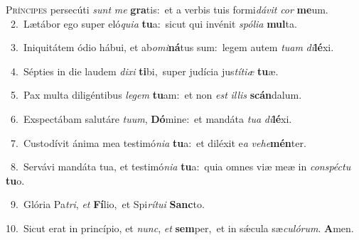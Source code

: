 \lettrine{\initial\textcolor{\initialcolor}{P}}{ríncipes} persecúti \textit{sunt} \textit{me} \textbf{gra}\-tis:~\star et a verbis tuis formi\-\textit{dá}\-\textit{vit} \textit{cor} \textbf{me}\-um.\\
{\numbfont\textcolor{\numbcolor}{~2.}}~Lætábor ego super eló\-\textit{qui}\-\textit{a} \textbf{tu}\-a:~\star sicut qui invénit \textit{spó}\-\textit{li}\textit{a} \textbf{mul}\-ta.\par
{\numbfont\textcolor{\numbcolor}{~3.}}~Iniquitátem ódio hábui, et ab\-\textit{o}\-\textit{mi}\textbf{ná}tus sum:~\star legem autem \textit{tu}\-\textit{am} \textit{di}\-\textbf{lé}xi.\par
{\numbfont\textcolor{\numbcolor}{~4.}}~Sépties in die laudem \textit{di}\-\textit{xi} \textbf{ti}\-bi,~\star super judícia jus\-\textit{tí}\-\textit{ti}\textit{æ} \textbf{tu}\-æ.\par
{\numbfont\textcolor{\numbcolor}{~5.}}~Pax multa diligéntibus \textit{le}\-\textit{gem} \textbf{tu}\-am:~\star et non \textit{est} \textit{il}\-\textit{lis} \textbf{scán}\-dalum.\par
{\numbfont\textcolor{\numbcolor}{~6.}}~Exspectábam salutáre \textit{tu}\-\textit{um}, \textbf{Dó}\-mine:~\star et mandáta \textit{tu}\-\textit{a} \textit{di}\-\textbf{lé}xi.\par
{\numbfont\textcolor{\numbcolor}{~7.}}~Custodívit ánima mea testimó\-\textit{ni}\-\textit{a} \textbf{tu}\-a:~\star et diléxit e\textit{a} \textit{ve}\-\textit{he}\textbf{mén}ter.\par
{\numbfont\textcolor{\numbcolor}{~8.}}~Servávi mandáta tua, et testimó\-\textit{ni}\-\textit{a} \textbf{tu}\-a:~\star quia omnes viæ meæ in \textit{con}\-\textit{spéc}\textit{tu} \textbf{tu}\-o.\par
{\numbfont\textcolor{\numbcolor}{~9.}}~Glória Pa\-\textit{tri}\-, \textit{et} \textbf{Fí}\-lio,~\star et Spi\-\textit{rí}\-\textit{tu}\textit{i} \textbf{Sanc}\-to.\par
{\numbfont\textcolor{\numbcolor}{10.}}~Sicut erat in princípio, et \textit{nunc}\-, \textit{et} \textbf{sem}\-per,~\star et in sǽcula sæ\-\textit{cu}\-\textit{ló}\textit{rum}. \textbf{A}\-men.\par
